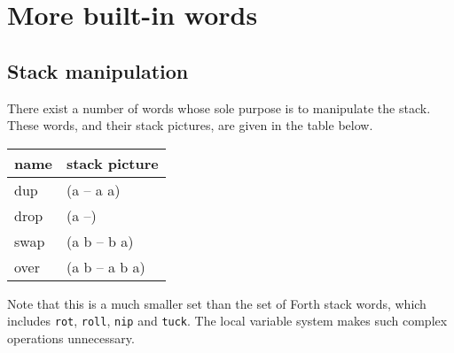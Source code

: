 \section{More built-in words}

\subsection{Stack manipulation}
There exist a number of words whose sole purpose is to manipulate
the stack. These words, and their stack pictures, are given in the table
below.
\begin{center}
\begin{tabular}{|l|p{4in}|}\hline
\textbf{name} & \textbf{stack picture}\\ \hline
dup & (a -- a a)\\
drop & (a --)\\
swap & (a b -- b a)\\
over & (a b -- a b a)\\
\hline
\end{tabular}
\end{center}
Note that this is a much smaller set than the set of Forth stack
words, which includes \texttt{rot}, \texttt{roll}, \texttt{nip} and \texttt{tuck}.
The local variable system makes such complex operations unnecessary.

